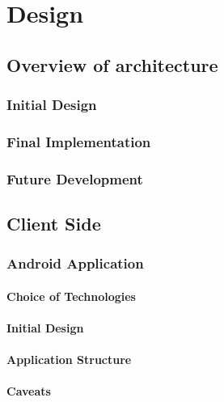 \chapter{Design}



\section{Overview of architecture}

\subsection{Initial Design}

\subsection{Final Implementation}

\subsection{Future Development}



\section{Client Side}

\subsection{Android Application}

\subsubsection*{Choice of Technologies}

\subsubsection*{Initial Design}

\subsubsection*{Application Structure}

\subsubsection*{Caveats}


